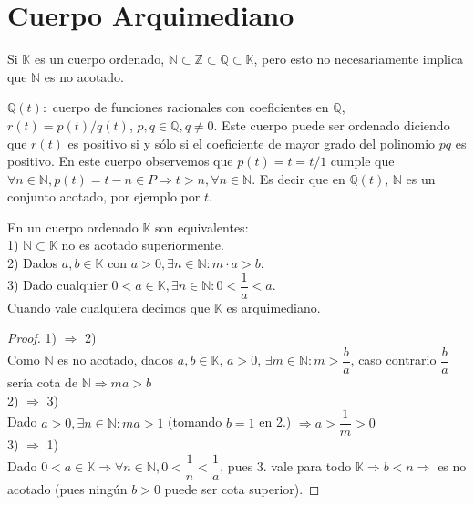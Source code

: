 \section{Cuerpo Arquimediano}

Si $\mathbb{K}$ es un cuerpo ordenado, $\mathbb{N} \subset \mathbb{Z} \subset \mathbb{Q} \subset \mathbb{K}$, pero esto no necesariamente implica que $\mathbb{N}$ es no acotado. 

\begin{eg}
    $\mathbb{Q}(t):$ cuerpo de funciones racionales con coeficientes en $\mathbb{Q}$, $r(t) = p(t)/q(t)$, $p, q \in \mathbb{Q}, q \neq 0$. Este cuerpo puede ser ordenado diciendo que $r(t)$ es positivo si y sólo si el coeficiente de mayor grado del polinomio $pq$ es positivo.
    En este cuerpo observemos que $p(t)=t=t/1$ cumple que $\forall n \in \mathbb{N}, p(t)=t-n \in P \Rightarrow t>n, \forall n \in \mathbb{N}$. Es decir que en $\mathbb{Q}(t)$, $\mathbb{N}$ es un conjunto acotado, por ejemplo por $t$.
\end{eg}

\begin{theorem}
    En un cuerpo ordenado $\mathbb{K}$ son equivalentes: \\
    1) $\mathbb{N} \subset \mathbb{K}$ no es acotado superiormente. \\ 
    2) Dados $a, b \in \mathbb{K}$ con $a>0, \exists n \in \mathbb{N}:m \cdot a>b$. \\
    3) Dado cualquier $0<a \in \mathbb{K}, \exists n \in \mathbb{N} : 0 < \dfrac{1}a < a$. \\
    Cuando vale cualquiera decimos que $\mathbb{K}$ es arquimediano.
    \begin{proof}
        1) $\Rightarrow$ 2) \\
        Como $\mathbb{N}$ es no acotado, dados $a,b \in \mathbb{K}$, $a>0$, $\exists m \in \mathbb{N} : m > \dfrac ba$, caso contrario $\dfrac ba$ sería cota de $\mathbb{N} \Rightarrow ma>b$ \\
        2) $\Rightarrow$ 3) \\
        Dado $a>0, \exists n \in \mathbb{N} : ma>1$ (tomando $b=1$ en 2.) $\Rightarrow a>\dfrac 1m >0$ \\
        3) $\Rightarrow$ 1) \\
        Dado $0<a \in \mathbb{K} \Rightarrow \forall n \in \mathbb{N}, 0<\dfrac 1n<\dfrac 1a$, pues 3. vale para todo $\mathbb{K} \Rightarrow b<n \Rightarrow$ es no acotado (pues ningún $b>0$ puede ser cota superior).
    \end{proof}
\end{theorem}


